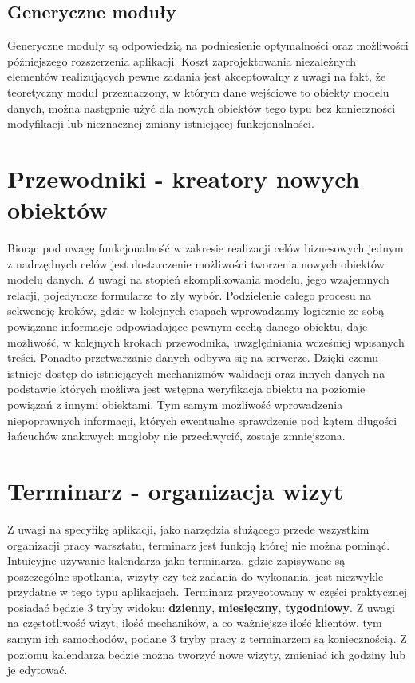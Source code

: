 	\subsection{Generyczne moduły}
		Generyczne moduły są odpowiedzią na podniesienie optymalności oraz możliwości późniejszego rozszerzenia aplikacji. Koszt zaprojektowania niezależnych elementów realizujących pewne zadania jest akceptowalny z uwagi na fakt, że teoretyczny moduł przeznaczony, w którym dane wejściowe to obiekty modelu danych, można następnie użyć dla nowych obiektów tego typu bez konieczności modyfikacji lub nieznacznej zmiany istniejącej funkcjonalności.
	\section{Przewodniki - kreatory nowych obiektów}
		Biorąc pod uwagę funkcjonalność w zakresie realizacji celów biznesowych jednym z nadrzędnych celów jest dostarczenie możliwości tworzenia nowych obiektów modelu danych. Z uwagi na stopień skomplikowania modelu, jego wzajemnych relacji, pojedyncze formularze to zły wybór. Podzielenie całego procesu na sekwencję kroków, gdzie w kolejnych etapach wprowadzamy logicznie ze sobą powiązane informacje odpowiadające pewnym cechą danego obiektu, daje możliwość, w kolejnych krokach przewodnika, uwzględniania wcześniej wpisanych treści. Ponadto przetwarzanie danych odbywa się na serwerze. Dzięki czemu istnieje dostęp do istniejących mechanizmów walidacji oraz innych danych na podstawie których możliwa jest wstępna weryfikacja obiektu na poziomie powiązań z innymi obiektami. Tym samym możliwość wprowadzenia niepoprawnych informacji, których ewentualne sprawdzenie pod kątem długości łańcuchów znakowych mogłoby nie przechwycić, zostaje zmniejszona.
	\section{Terminarz - organizacja wizyt}
		Z uwagi na specyfikę aplikacji, jako narzędzia służącego przede wszystkim organizacji pracy warsztatu, terminarz jest funkcją której nie można pominąć. Intuicyjne używanie kalendarza jako terminarza, gdzie zapisywane są poszczególne spotkania, wizyty czy też zadania do wykonania, jest niezwykle przydatne w tego typu aplikacjach. Terminarz przygotowany w części praktycznej posiadać będzie 3 tryby widoku: \textbf{dzienny}, \textbf{miesięczny}, \textbf{tygodniowy}. Z uwagi na częstotliwość wizyt, ilość mechaników, a co ważniejsze ilość klientów, tym samym ich samochodów, podane 3 tryby pracy z terminarzem są koniecznością. Z poziomu kalendarza będzie można tworzyć nowe wizyty, zmieniać ich godziny lub je edytować. 
